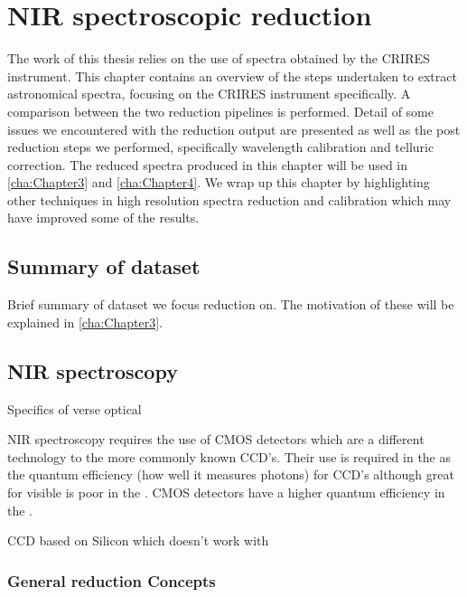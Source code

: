 
\chapter{NIR spectroscopic reduction} %
\label{cha:reduction} 
The work of this thesis relies on the use of {\nir} spectra obtained by the CRIRES instrument. This chapter contains an overview of the steps undertaken to extract astronomical spectra, focusing on the CRIRES instrument specifically. A comparison between the two reduction pipelines is performed. Detail of some issues we encountered with the reduction output are presented as well as the post reduction steps we performed, specifically wavelength calibration and telluric correction. The reduced spectra produced in this chapter will be used in \cref{cha:Chapter3} and \cref{cha:Chapter4}. We wrap up this chapter by highlighting other techniques in high resolution {\nir} spectra reduction and calibration which may have improved some of the results.  

\section{Summary of dataset}
\todo{}{}
Brief summary of dataset we focus reduction on. The motivation of these will be explained in \cref{cha:Chapter3}.

 
\section{NIR spectroscopy}
\todo{}{}
Specifics of {\nir} verse optical

NIR spectroscopy requires the use of CMOS detectors which are a different technology to the more commonly known CCD's. Their use is required in the {\nir} as the quantum efficiency (how well it measures photons) for CCD's although great for visible is poor in the \nir. CMOS detectors have a higher quantum efficiency in the \nir. 

CCD based on Silicon which doesn't work with \nir


\subsection{General reduction Concepts}
\label{subsec:nirreduction}


